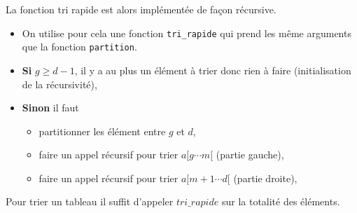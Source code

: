 La fonction tri rapide est alors implémentée de façon récursive.
\begin{itemize}
\item On utilise pour cela une fonction \texttt{tri\_rapide} qui prend les même arguments que la fonction \texttt{partition}.
\item \textbf{Si} \textbf{$g\geq d-1$}, il y a au plus un élément à trier donc rien à faire (initialisation de la récursivité),
\item \textbf{Sinon} il faut
\begin{itemize}
\item partitionner les élément entre \textbf{$g$} et \textbf{$d$},
\item faire un appel récursif pour trier $a[g\cdots m[$ (partie gauche),
\item faire un appel récursif pour trier $a[m+1\cdots d[$ (partie droite),
\end{itemize} 
\end{itemize} 



Pour trier un tableau il suffit d'appeler \textbf{$tri\_rapide$} sur la totalité des éléments.


%
%
%

